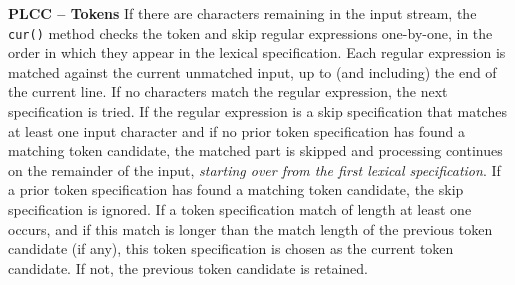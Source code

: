 \begin{minipage}[t]{\sw}
\slidenumber
\LARGE
{\bf PLCC -- Tokens}\exx
If there are characters remaining in the input stream,
the \verb'cur()' method checks
the token and skip regular expressions one-by-one,
in the order in which they appear
in the lexical specification.
Each regular expression is matched
against the current unmatched input,
up to (and including) the end of the current line.
If no characters match the regular expression,
the next specification is tried.\exx
If the regular expression is a skip specification
that matches at least one input character
and if no prior token specification has found a matching token candidate,
the matched part is skipped and processing continues
on the remainder of the input,
{\em starting over from the first lexical specification}.
If a prior token specification has found a matching token candidate,
the skip specification is ignored.\exx
If a token specification match of length at least one occurs,
and if this match is longer than the match length
of the previous token candidate (if any),
this token specification is chosen
as the current token candidate.
If not, the previous token candidate is retained.\exx
\end{minipage}
\clearpage
